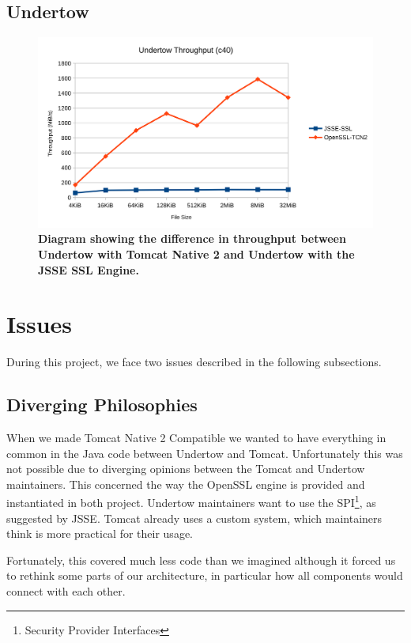 \documentclass[11pt,a4paper,bibliography=totocnumbered]{scrartcl}
\def\mytitle{Tomcat Native 2}
\begin{document}
\subsection{Undertow}
\begin{figure}[!h]
	\begin{center}
		\includegraphics[scale=0.23]{undertow-throughput.pdf}
	\end{center}
	\caption{\textbf{Diagram showing the difference in throughput between Undertow with \mytitle{} and Undertow with the JSSE SSL Engine.}}
	\label{fig:undertow-throughput}
\end{figure}

\FloatBarrier
\section{Issues}
\label{sec:issues}
During this project, we face two issues described in the following subsections.
\subsection{Diverging Philosophies}
When we made \mytitle{} Compatible we wanted to have everything in common in the Java code between Undertow and Tomcat. Unfortunately this was not possible due to diverging opinions between the Tomcat and Undertow maintainers. This concerned the way the OpenSSL engine is provided and instantiated in both project. Undertow maintainers want to use the SPI\footnote{Security Provider Interfaces}, as suggested by JSSE. Tomcat already uses a custom system, which maintainers think is more practical for their usage.

Fortunately, this covered much less code than we imagined although it forced us to rethink some parts of our architecture, in particular how all components would connect with each other.
\end{document}
